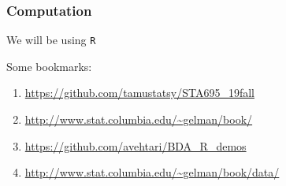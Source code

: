 \documentclass{beamer}
\begin{document}
\begin{frame}
\frametitle{Computation}

We will be using \texttt{R}
\newline


Some bookmarks:
\begin{enumerate}
\item \url{https://github.com/tamustatsy/STA695_19fall} 
\item \url{http://www.stat.columbia.edu/~gelman/book/}
\item \url{https://github.com/avehtari/BDA_R_demos}
\item \url{http://www.stat.columbia.edu/~gelman/book/data/}
\end{enumerate}



\end{frame}
\end{document}
